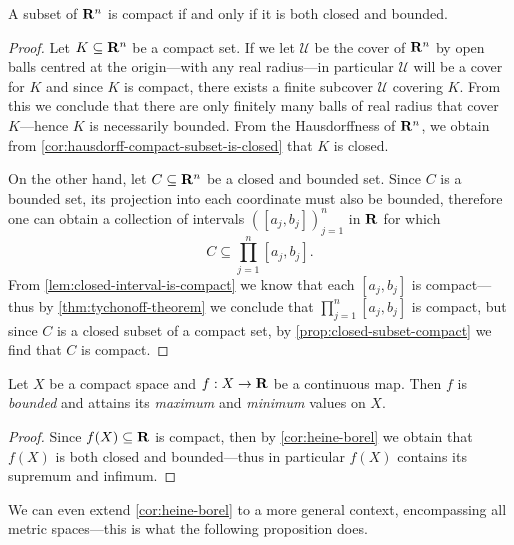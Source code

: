 \begin{corollary}
    \label{cor:heine-borel}
    A subset of \(\mathbf{R}^n\) is compact if and only if it is both closed and bounded.
\end{corollary}

\begin{proof}
    Let \(K \subseteq \mathbf{R}^n\) be a compact set. If we let \(\mathcal{U}\) be the
    cover of \(\mathbf{R}^n\) by open balls centred at the origin---with any real
    radius---in particular \(\mathcal{U}\) will be a cover for \(K\) and since \(K\)
    is compact, there exists a finite subcover \(\mathcal{U}\) covering \(K\). From
    this we conclude that there are only finitely many balls of real radius that
    cover \(K\)---hence \(K\) is necessarily bounded. From the Hausdorffness of
    \(\mathbf{R}^n\), we obtain from \cref{cor:hausdorff-compact-subset-is-closed} that
    \(K\) is closed.

    On the other hand, let \(C \subseteq \mathbf{R}^n\) be a closed and bounded set. Since
    \(C\) is a bounded set, its projection into each coordinate must also be
    bounded, therefore one can obtain a collection of intervals
    \(([a_j, b_j])_{j=1}^n\) in \(\mathbf{R}\) for which
    \[
        C \subseteq \prod_{j=1}^n [a_j, b_j].
    \]
    From \cref{lem:closed-interval-is-compact} we know that each \([a_j, b_j]\) is
    compact---thus by \cref{thm:tychonoff-theorem} we conclude that
    \(\prod_{j=1}^n [a_j, b_j]\) is compact, but since \(C\) is a closed subset of a
    compact set, by \cref{prop:closed-subset-compact} we find that \(C\) is compact.
\end{proof}

\begin{corollary}
    \label{cor:extreme-values-on-compact-sets}
    Let \(X\) be a compact space and \(f: X \to \mathbf{R}\) be a continuous map. Then \(f\)
    is \emph{bounded} and attains its \emph{maximum} and \emph{minimum} values on
    \(X\).
\end{corollary}

\begin{proof}
    Since \(f(X) \subseteq \mathbf{R}\) is compact, then by \cref{cor:heine-borel} we obtain
    that \(f(X)\) is both closed and bounded---thus in particular \(f(X)\)
    contains its supremum and infimum.
\end{proof}

We can even extend \cref{cor:heine-borel} to a more general context,
encompassing all metric spaces---this is what the following proposition does.

